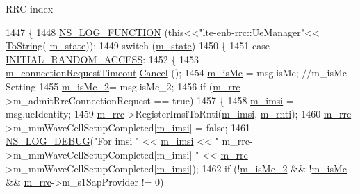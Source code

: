 R\+RC index 
\begin{DoxyCode}
1447 \{
1448   \hyperlink{log-macros-disabled_8h_a90b90d5bad1f39cb1b64923ea94c0761}{NS\_LOG\_FUNCTION} (\textcolor{keyword}{this}<<\textcolor{stringliteral}{"lte-enb-rrc::UeManager"}<< \hyperlink{namespacens3_a3d1f7e1bec1972e2ae8d64673fcfcd9c}{ToString}(
      \hyperlink{classns3_1_1UeManager_aaed4b2490297cb912e743084f1a27b08}{m\_state}));
1449   \textcolor{keywordflow}{switch} (\hyperlink{classns3_1_1UeManager_aaed4b2490297cb912e743084f1a27b08}{m\_state})
1450     \{
1451     \textcolor{keywordflow}{case} \hyperlink{classns3_1_1UeManager_a2f4085fdd18d7125c27da44a5b8b6808a6e92e7eaed87665e012ff9c3a4a9e4d3}{INITIAL\_RANDOM\_ACCESS}:
1452       \{
1453         \hyperlink{classns3_1_1UeManager_a85948121037b466cea1baa6a51273def}{m\_connectionRequestTimeout}.\hyperlink{classns3_1_1EventId_a993ae94e48e014e1afd47edb16db7a11}{Cancel} ();
1454         \hyperlink{classns3_1_1UeManager_a78958b4916253f7e2f9da8fd7f4662b6}{m\_isMc} = msg.isMc; \textcolor{comment}{//m\_isMc Setting}
1455         \hyperlink{classns3_1_1UeManager_a1ff2a09ff4ed22e06fc86cb5ae614c83}{m\_isMc\_2}= msg.isMc\_2;
1456         \textcolor{keywordflow}{if} (\hyperlink{classns3_1_1UeManager_ab4405e9f354c66e7c1a4c95832290f5b}{m\_rrc}->m\_admitRrcConnectionRequest == \textcolor{keyword}{true})
1457           \{
1458             \hyperlink{classns3_1_1UeManager_a868dda076ecfc1d4202e357c16223d84}{m\_imsi} = msg.ueIdentity;
1459             \hyperlink{classns3_1_1UeManager_ab4405e9f354c66e7c1a4c95832290f5b}{m\_rrc}->RegisterImsiToRnti(\hyperlink{classns3_1_1UeManager_a868dda076ecfc1d4202e357c16223d84}{m\_imsi}, \hyperlink{classns3_1_1UeManager_a5a72b4fe818f21993bd7f05d7e2c4f83}{m\_rnti});
1460             \hyperlink{classns3_1_1UeManager_ab4405e9f354c66e7c1a4c95832290f5b}{m\_rrc}->m\_mmWaveCellSetupCompleted[\hyperlink{classns3_1_1UeManager_a868dda076ecfc1d4202e357c16223d84}{m\_imsi}] = \textcolor{keyword}{false};
1461             \hyperlink{group__logging_ga413f1886406d49f59a6a0a89b77b4d0a}{NS\_LOG\_DEBUG}(\textcolor{stringliteral}{"For imsi "} << \hyperlink{classns3_1_1UeManager_a868dda076ecfc1d4202e357c16223d84}{m\_imsi} << \textcolor{stringliteral}{"
       m\_rrc->m\_mmWaveCellSetupCompleted[m\_imsi] "} << \hyperlink{classns3_1_1UeManager_ab4405e9f354c66e7c1a4c95832290f5b}{m\_rrc}->m\_mmWaveCellSetupCompleted[\hyperlink{classns3_1_1UeManager_a868dda076ecfc1d4202e357c16223d84}{m\_imsi}]);
1462             \textcolor{keywordflow}{if} (!\hyperlink{classns3_1_1UeManager_a1ff2a09ff4ed22e06fc86cb5ae614c83}{m\_isMc\_2} && !\hyperlink{classns3_1_1UeManager_a78958b4916253f7e2f9da8fd7f4662b6}{m\_isMc} && \hyperlink{classns3_1_1UeManager_ab4405e9f354c66e7c1a4c95832290f5b}{m\_rrc}->m\_s1SapProvider != 0)

\end{DoxyCode}
